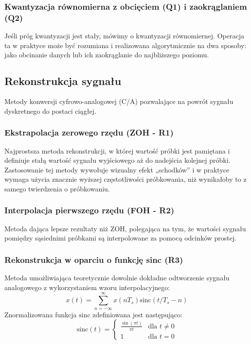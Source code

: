 \documentclass[12pt]{article}
\begin{document}
\subsubsection*{Kwantyzacja równomierna z obcięciem (Q1) i zaokrąglaniem (Q2)}
Jeśli próg kwantyzacji jest stały, mówimy o kwantyzacji równomiernej. Operacja ta w praktyce może być rozumiana i realizowana algorytmicznie na dwa sposoby: jako obcinanie danych lub ich zaokrąglanie do najbliższego poziomu. 

\subsection{Rekonstrukcja sygnału}
Metody konwersji cyfrowo-analogowej (C/A) pozwalające na powrót sygnału dyskretnego do postaci ciągłej.

\subsubsection*{Ekstrapolacja zerowego rzędu (ZOH - R1)}
Najprostsza metoda rekonstrukcji, w której wartość próbki jest pamiętana i definiuje stałą wartość sygnału wyjściowego aż do nadejścia kolejnej próbki. Zastosowanie tej metody wywołuje wizualny efekt „schodków” i w praktyce wymaga użycia znacznie wyższej częstotliwości próbkowania, niż wynikałoby to z samego twierdzenia o próbkowaniu.

\subsubsection*{Interpolacja pierwszego rzędu (FOH - R2)}
Metoda dająca lepsze rezultaty niż ZOH, polegająca na tym, że wartości sygnału pomiędzy sąsiednimi próbkami są interpolowane za pomocą odcinków prostej.

\subsubsection*{Rekonstrukcja w oparciu o funkcję sinc (R3)}
Metoda umożliwiająca teoretycznie dowolnie dokładne odtworzenie sygnału analogowego z wykorzystaniem wzoru interpolacyjnego:
\begin{equation}
	x(t) = \sum_{n=-\infty}^{\infty} x(nT_s) \text{sinc}(t/T_s - n)
\end{equation}
Znormalizowana funkcja $\text{sinc}$ zdefiniowana jest następująco:
\begin{equation}
	\text{sinc}(t) = 
	\begin{cases} 
		\frac{\sin(\pi t)}{\pi t} & \text{dla } t \neq 0 \\ 
		1 & \text{dla } t = 0 
	\end{cases}
\end{equation}
\end{document}
